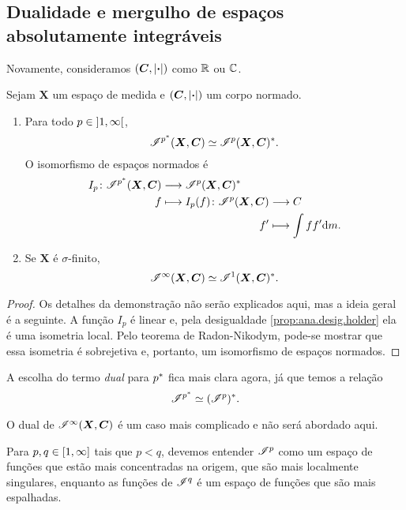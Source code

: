 \subsection{Dualidade e mergulho de espaços absolutamente integráveis}

Novamente, consideramos $(\bm C,\left\vert{\bm{\cdot}}\right\vert)$ como $\mathbb{R}$ ou $\mathbb{C}$.

\begin{proposition}
Sejam $\bm X$ um espaço de medida e $(\bm C,\left\vert{\bm{\cdot}}\right\vert)$ um corpo normado.
	\begin{enumerate}
	\item Para todo $p \in \left]{1},{\infty}\right[$, 
		\begin{equation*}
		\mathscr{I}^{p^*}(\bm X,\bm C) \simeq \mathscr{I}^p(\bm X,\bm C)^*.
		\end{equation*}
O isomorfismo de espaços normados é
		\begin{align*}
		\func{I_p}{\Intg^{p\dual}(\bm X,\bm C)}{\Intg^p(\bm X,\bm C)\dual}{f}{
			\begin{aligned}[t]
			\func{I_p(f)}{\Intg^p(\bm X,\bm C)}{C}{f'}{\int ff' \dd\med}.
			\end{aligned}
		}
		\end{align*}
	
	\item Se $\bm X$ é $\sigma$-finito,
		\begin{equation*}
		\mathscr{I}^\infty(\bm X,\bm C) \simeq \mathscr{I}^1(\bm X,\bm C)^*.
		\end{equation*}	
	\end{enumerate}
\end{proposition}
\begin{proof}
Os detalhes da demonstração não serão explicados aqui, mas a ideia geral é a seguinte. A função $I_p$ é linear e, pela desigualdade \ref{prop:ana.desig.holder} ela é uma isometria local. Pelo teorema de Radon-Nikodym, pode-se mostrar que essa isometria é sobrejetiva e, portanto, um isomorfismo de espaços normados.
\end{proof}

A escolha do termo \textit{dual} para $p^*$ fica mais clara agora, já que temos a relação
	\begin{equation*}
	\mathscr{I}^{p^*} \simeq (\mathscr{I}^p)^*.
	\end{equation*}

O dual de $\mathscr{I}^\infty(\bm X,\bm C)$ é um caso mais complicado e não será abordado aqui.

Para $p,q \in \left[{1},{\infty}\right]$ tais que $p < q$, devemos entender $\mathscr{I}^p$ como um espaço de funções que estão mais concentradas na origem, que são mais localmente singulares, enquanto as funções de $\mathscr{I}^q$ é um espaço de funções que são mais espalhadas.

